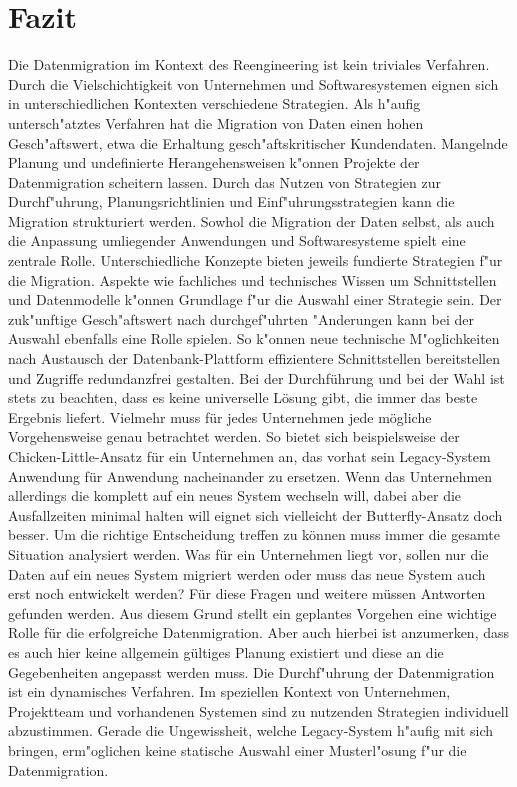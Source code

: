 \section{Fazit}
\label{chapter:fazit}

Die Datenmigration im Kontext des Reengineering ist kein triviales Verfahren. Durch die Vielschichtigkeit von Unternehmen und Softwaresystemen eignen sich in unterschiedlichen Kontexten verschiedene Strategien. Als h"aufig untersch"atztes Verfahren hat die Migration von Daten einen hohen Gesch"aftswert, etwa die Erhaltung gesch"aftskritischer Kundendaten. Mangelnde Planung und undefinierte Herangehensweisen k"onnen Projekte der Datenmigration scheitern lassen. Durch das Nutzen von Strategien zur Durchf"uhrung, Planungsrichtlinien und Einf"uhrungsstrategien kann die Migration strukturiert werden.
\lb
Sowhol die Migration der Daten selbst, als auch die Anpassung umliegender Anwendungen und Softwaresysteme spielt eine zentrale Rolle. Unterschiedliche Konzepte bieten jeweils fundierte Strategien f"ur die Migration. Aspekte wie fachliches und technisches Wissen um Schnittstellen und Datenmodelle k"onnen Grundlage f"ur die Auswahl einer Strategie sein. Der zuk"unftige Gesch"aftswert nach durchgef"uhrten "Anderungen kann bei der Auswahl ebenfalls eine Rolle spielen. So k"onnen neue technische M"oglichkeiten nach Austausch der Datenbank-Plattform effizientere Schnittstellen bereitstellen und Zugriffe redundanzfrei gestalten.
\lb
Bei der Durchführung und bei der Wahl ist stets zu beachten, dass es keine universelle Lösung gibt, die immer das beste Ergebnis liefert. Vielmehr muss für jedes Unternehmen jede mögliche Vorgehensweise genau betrachtet werden. So bietet sich beispielsweise der Chicken-Little-Ansatz für ein Unternehmen an, das vorhat sein Legacy-System Anwendung für Anwendung nacheinander zu ersetzen. Wenn das Unternehmen allerdings die komplett auf ein neues System wechseln will, dabei aber die Ausfallzeiten minimal halten will eignet sich vielleicht der Butterfly-Ansatz doch besser. 
\lb
Um die richtige Entscheidung treffen zu können muss immer die gesamte Situation analysiert werden. Was für ein Unternehmen liegt vor, sollen nur die Daten auf ein neues System migriert werden oder muss das neue System auch erst noch entwickelt werden? Für diese Fragen und weitere müssen Antworten gefunden werden. Aus diesem Grund stellt ein geplantes Vorgehen eine wichtige Rolle für die erfolgreiche Datenmigration. Aber auch hierbei ist anzumerken, dass es auch hier keine allgemein gültiges Planung existiert und diese an die Gegebenheiten angepasst werden muss. 
\lb
Die Durchf"uhrung der Datenmigration ist ein dynamisches Verfahren. Im speziellen Kontext von Unternehmen, Projektteam und vorhandenen Systemen sind zu nutzenden Strategien individuell abzustimmen. Gerade die Ungewissheit, welche Legacy-System h"aufig mit sich bringen, erm"oglichen keine statische Auswahl einer Musterl"osung f"ur die Datenmigration.